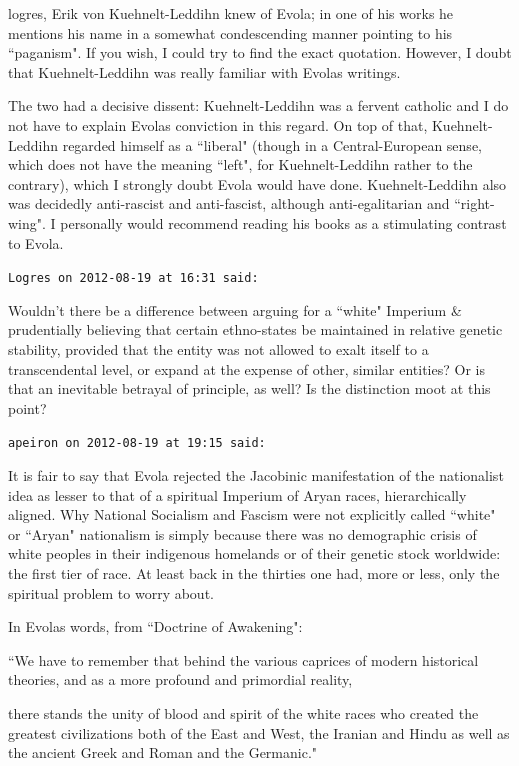 \begin{footnotesize}
\begin{sffamily}
logres, Erik von Kuehnelt-Leddihn knew of Evola; in one of his works he mentions his name in a somewhat condescending manner pointing to his ``paganism". If you wish, I could try to find the exact quotation. However, I doubt that Kuehnelt-Leddihn was really familiar with Evolas writings.

The two had a decisive dissent: Kuehnelt-Leddihn was a fervent catholic and I do not have to explain Evolas conviction in this regard. On top of that, Kuehnelt-Leddihn regarded himself as a ``liberal" (though in a Central-European sense, which does not have the meaning ``left", for Kuehnelt-Leddihn rather to the contrary), which I strongly doubt Evola would have done. Kuehnelt-Leddihn also was decidedly anti-rascist and anti-fascist, although anti-egalitarian and ``right-wing". I personally would recommend reading his books as a stimulating contrast to Evola.


\hfill

\texttt{Logres on 2012-08-19 at 16:31 said: }

Wouldn't there be a difference between arguing for a ``white" Imperium \& prudentially believing that certain ethno-states be maintained in relative genetic stability, provided that the entity was not allowed to exalt itself to a transcendental level, or expand at the expense of other, similar entities? Or is that an inevitable betrayal of principle, as well? Is the distinction moot at this point?


\hfill

\texttt{apeiron on 2012-08-19 at 19:15 said: }

It is fair to say that Evola rejected the Jacobinic manifestation of the nationalist idea as lesser to that of a spiritual Imperium of Aryan races, hierarchically aligned. Why National Socialism and Fascism were not explicitly called ``white" or ``Aryan" nationalism is simply because there was no demographic crisis of white peoples in their indigenous homelands or of their genetic stock worldwide: the first tier of race. At least back in the thirties one had, more or less, only the spiritual problem to worry about.

In Evolas words, from ``Doctrine of Awakening": 

``We have to remember that behind the various caprices of modern historical theories, and as a more profound and primordial reality,

there stands the unity of blood and spirit of the white races who created the greatest civilizations both of the East and West, the Iranian and Hindu as well as the ancient Greek and Roman and the Germanic."


\end{sffamily}
\end{footnotesize}

